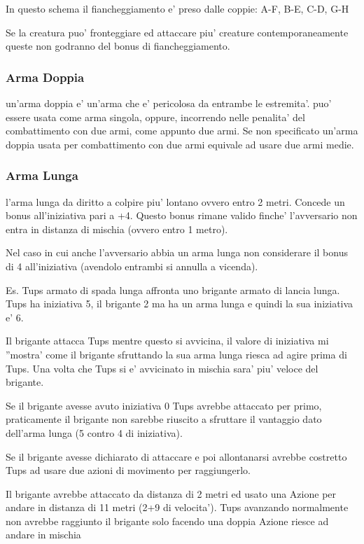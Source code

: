 \documentclass[a4paper,11pt,twoside,openany]{book}
\begin{document}
	\bigskip
	
	In questo schema il fiancheggiamento e' preso dalle coppie: A-F, B-E, C-D, G-H
	
	\bigskip
	
	Se la creatura puo' fronteggiare ed attaccare piu' creature contemporaneamente queste non godranno del bonus di fiancheggiamento.
	
	\subsubsection{Arma Doppia} un'arma doppia e' un'arma che e' pericolosa da entrambe le estremita'. puo' essere usata come arma singola, oppure, incorrendo nelle penalita' del combattimento con due armi, come appunto due armi. Se non specificato un'arma doppia usata per combattimento con due armi equivale ad usare due armi medie.
	
	\subsubsection{Arma Lunga} l'arma lunga da diritto a colpire piu' lontano ovvero entro 2 metri. Concede un bonus all'iniziativa pari a +4. Questo bonus rimane valido finche' l'avversario non entra in distanza di mischia (ovvero entro 1 metro).
	
	Nel caso in cui anche l'avversario abbia un arma lunga non considerare il bonus di 4 all'iniziativa (avendolo entrambi si annulla a vicenda).
	
	Es. Tups armato di spada lunga affronta uno brigante armato di lancia lunga. Tups ha iniziativa 5, il brigante 2 ma ha un arma lunga e quindi la sua iniziativa e' 6.
	
	Il brigante attacca Tups mentre questo si avvicina, il valore di iniziativa mi ''mostra' come il brigante sfruttando la sua arma lunga riesca ad agire prima di Tups. Una volta che Tups si e' avvicinato in mischia sara' piu' veloce del brigante.
	
	Se il brigante avesse avuto iniziativa 0 Tups avrebbe attaccato per primo, praticamente il brigante non sarebbe riuscito a sfruttare il vantaggio dato dell'arma lunga (5 contro 4 di iniziativa).
	
	Se il brigante avesse dichiarato di attaccare e poi allontanarsi avrebbe costretto Tups ad usare due azioni di movimento per raggiungerlo.
	
	Il brigante avrebbe attaccato da distanza di 2 metri ed usato una Azione per andare in distanza di 11 metri (2+9 di velocita'). Tups avanzando normalmente non avrebbe raggiunto il brigante solo facendo una doppia Azione riesce ad andare in mischia
	
\end{document}
